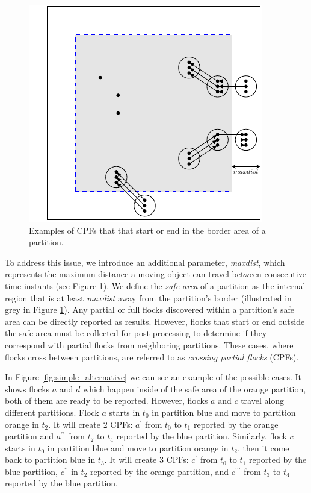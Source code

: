 \begin{figure}
    \centering
    \includegraphics[width=0.5\linewidth]{chapterPFlocks/figures/maxdist.pdf}
    \caption{Examples of CPFs that that start or end in the border area of a partition.}\label{fig:maxdist}
\end{figure}

To address this issue, we introduce an additional parameter, \textit{maxdist}, which represents the maximum distance a moving object can travel between 
consecutive time instants (see Figure \ref{fig:maxdist}). We define the \textit{safe area} of a partition as the internal region that is at least \textit{maxdist} away from the partition’s border (illustrated in grey in Figure \ref{fig:maxdist}). Any partial or full flocks discovered within a partition’s safe area can be directly reported as results. However, flocks that start or end outside the safe area must be collected for post-processing to determine if they correspond with partial flocks from neighboring partitions. These cases, where flocks cross between partitions, are referred to as \textit{crossing partial flocks} (CPFs).  

In Figure \ref{fig:simple_alternative} we can see an example of the possible cases.  It shows flocks $a$ and $d$ which happen inside of the safe area of the orange partition, both of them are ready to be reported.  However, flocks $a$ and $c$ travel along different partitions.  Flock $a$ starts in $t_0$ in partition blue and move to partition orange in $t_2$.  It will create 2 CPFs: $a^{\prime}$ from $t_{0}$ to $t_{1}$ reported by the orange partition and $a^{\prime \prime}$ from $t_{2}$ to $t_{4}$ reported by the blue partition.  Similarly, flock $c$ starts in $t_0$ in partition blue and move to partition orange in $t_2$, then it come back to partition blue in $t_3$.  It will create 3 CPFs: $c^{\prime}$ from $t_{0}$ to $t_{1}$ reported by the blue partition, $c^{\prime \prime}$ in ${t_2}$ reported by the orange partition, and $c^{\prime \prime \prime}$ from $t_{3}$ to $t_{4}$ reported by the blue partition.

